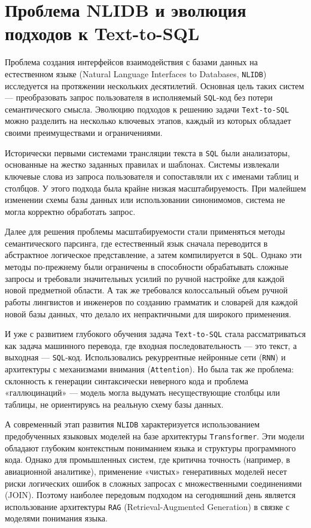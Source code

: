 
\section{Проблема NLIDB и эволюция подходов к Text-to-SQL}

Проблема создания интерфейсов взаимодействия с базами данных на естественном языке (Natural Language Interfaces to Databases, \texttt{NLIDB}) исследуется на протяжении нескольких десятилетий. Основная цель таких систем — преобразовать запрос пользователя в исполняемый \texttt{SQL}-код без потери семантического смысла. Эволюцию подходов к решению задачи \texttt{Text-to-SQL} можно разделить на несколько ключевых этапов, каждый из которых обладает своими преимуществами и ограничениями.

Исторически первыми системами трансляции текста в \texttt{SQL} были анализаторы, основанные на жестко заданных правилах и шаблонах. Системы извлекали ключевые слова из запроса пользователя и сопоставляли их с именами таблиц и столбцов. У этого подхода была крайне низкая масштабируемость. При малейшем изменении схемы базы данных или использовании синонимомов, система не могла корректно обработать запрос.

Далее для решения проблемы масштабируемости стали применяться методы семантического парсинга, где естественный язык сначала переводится в абстрактное логическое представление, а затем компилируется в \texttt{SQL}. Однако эти методы по-прежнему были ограничены в способности обрабатывать сложные запросы и требовали значительных усилий по ручной настройке для каждой новой предметной области. А так же требовался колоссальный объем ручной работы лингвистов и инженеров по созданию грамматик и словарей для каждой новой базы данных, что делало их непрактичными для широкого применения.

И уже с развитием глубокого обучения задача \texttt{Text-to-SQL} стала рассматриваться как задача машинного перевода, где входная последовательность — это текст, а выходная — \texttt{SQL}-код. Использовались рекуррентные нейронные сети (\texttt{RNN}) и архитектуры с механизмами внимания (\texttt{Attention}). Но была так же проблема: склонность к генерации синтаксически неверного кода и проблема «галлюцинаций» — модель могла выдумать несуществующие столбцы или таблицы, не ориентируясь на реальную схему базы данных.

А современный этап развития \texttt{NLIDB} характеризуется использованием предобученных языковых моделей на базе архитектуры \texttt{Transformer}. Эти модели обладают глубоким контекстным пониманием языка и структуры программного кода. Однако для промышленных систем, где критична точность (например, в авиационной аналитике), применение «чистых» генеративных моделей несет риски логических ошибок в сложных запросах с множественными соединениями (JOIN). Поэтому наиболее передовым подходом на сегодняшний день является использование архитектуры \texttt{RAG} (Retrieval-Augmented Generation) в связке с моделями понимания языка.

